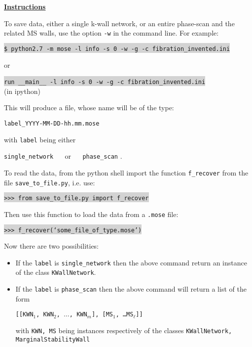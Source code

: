\documentclass[11pt]{report}
\begin{document}
\medskip


{\color{red} \bf \Large\underline{Instructions}}

To save data, either a single k-wall network, or an entire phase-scan and the related MS walls, use the option {\tt -w} in the command line. 
For example:

\smallskip

\indent \colorbox{lightgray}{\tt \$ python2.7 -m mose -l info -s 0 -w -g -c fibration\_{invented}.ini} 


\smallskip

or

\smallskip

\indent \colorbox{lightgray}{\tt run \_\_main\_\_  -l info -s 0 -w -g -c fibration\_{invented}.ini} $\qquad\qquad\qquad$ (in ipython)

\smallskip


This will produce a file, whose name will be of the type:
\begin{center}
{\tt label\_YYYY-MM-DD-hh.mm.mose} 
\end{center}
with {\tt label} being either
\begin{center}
{\tt single\_network} $\quad$ or $\quad$  {\tt phase\_scan} .
\end{center}

To read the data, from the python shell import the function {\tt f\_{recover}} from the file {\tt save\_to\_file.py}, i.e. use:

\smallskip

\indent \colorbox{lightgray}{\tt>>> from save\_to\_file.py import f\_recover}

\smallskip

\noindent Then use this function to load the data from a {\tt *.mose} file:

\smallskip

\indent \colorbox{lightgray}{\tt>>> f\_recover(`some\_file\_of\_type.mose')}

\bigskip

\noindent Now there are two possibilities: 
\begin{itemize}
	\item If the {\tt label} is {\tt single\_network} then the above command return an instance of the class {\tt KWallNetwork}.
	\item If the  {\tt label} is {\tt phase\_scan} then the above command will return a list of the form\\
	\begin{center}  {\tt [[KWN${}_{1}$, KWN${}_{2}$, $\dots$, KWN${}_{m}$], [MS${}_{1}$, \dots MS${}_{\ell}$]]}  \end{center}
	with {\tt KWN, MS} being instances respectively of the classes {\tt KWallNetwork, MarginalStabilityWall}
\end{itemize}
\end{document}
